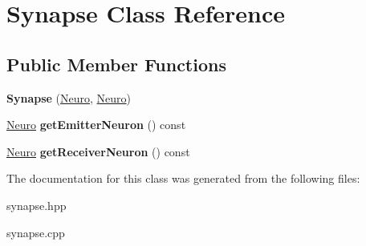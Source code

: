 \hypertarget{classSynapse}{\section{Synapse Class Reference}
\label{classSynapse}
}
\subsection*{Public Member Functions}
\begin{DoxyCompactItemize}
\item 
\hypertarget{classSynapse_acb69ce5376dabc0b7978bb8d427a715e}{{\bfseries Synapse} (\hyperlink{classNeuro}{Neuro}, \hyperlink{classNeuro}{Neuro})}\label{classSynapse_acb69ce5376dabc0b7978bb8d427a715e}

\item 
\hypertarget{classSynapse_ad99e101cf851f397fac53076b5484efb}{\hyperlink{classNeuro}{Neuro} {\bfseries get\-Emitter\-Neuron} () const }\label{classSynapse_ad99e101cf851f397fac53076b5484efb}

\item 
\hypertarget{classSynapse_afd7b123f52384e5aac0a2e177591f00b}{\hyperlink{classNeuro}{Neuro} {\bfseries get\-Receiver\-Neuron} () const }\label{classSynapse_afd7b123f52384e5aac0a2e177591f00b}

\end{DoxyCompactItemize}


The documentation for this class was generated from the following files\-:\begin{DoxyCompactItemize}
\item 
synapse.\-hpp\item 
synapse.\-cpp\end{DoxyCompactItemize}

